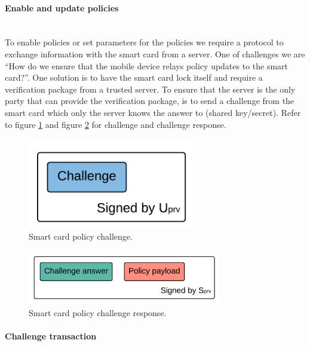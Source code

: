 \paragraph{Enable and update policies}\mbox{}\\
To enable policies or set parameters for the policies we require a protocol to exchange information with the smart card from a server. One of challenges we are ``How do we ensure that the mobile device relays policy updates to the smart card?''. One solution is to have the smart card lock itself and require a verification package from a trusted server. To ensure that the server is the only party that can provide the verification package, is to send a challenge from the smart card which only the server knows the answer to (shared key/secret). Refer to figure \ref{fig:OH} and figure \ref{fig:NH} for challenge and challenge response.

\begin{figure}[h!]
  \captionsetup{justification=centering,margin=1.5cm}
  \caption{Smart card policy challenge.}
  \label{fig:OH}
  \centering
    \includegraphics[width=0.65\textwidth]{images/challenge.png}
\end{figure}

\begin{figure}[h!]
  \captionsetup{justification=centering,margin=1.5cm}
  \caption{Smart card policy challenge response.}
  \label{fig:NH}
  \centering
    \includegraphics[width=0.75\textwidth]{images/challenge_response.png}
\end{figure}

\newpage

\paragraph{Challenge transaction}\mbox{}\\

